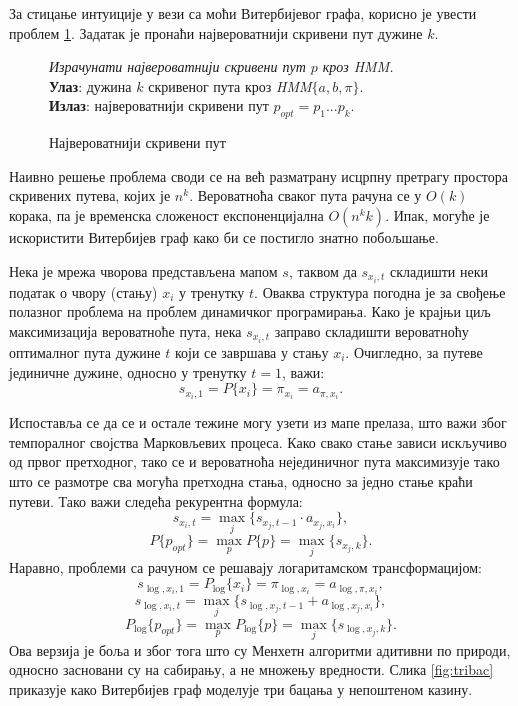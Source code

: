 \documentclass[12pt,oneside]{memoir}
\newenvironment{problem}[1][!ht]
{\renewcommand{\algorithmcfname}{Проблем}
\begin{figure}[!ht]
\centering
  \begin{minipage}{.94\linewidth}
	\begin{algorithm}[#1]%
  }{\end{algorithm}
  \end{minipage}
\end{figure}}
\begin{document}
\begin{CJK}{UTF8}{ipxm}
За стицање интуиције у вези са моћи Витербијевог графа, корисно је увести проблем \ref{prob:maxput}. Задатак је пронаћи највероватнији скривени пут дужине $k$.

\begin{problem}[H]
  \SetAlgoLined
  \textit{Израчунати највероватнији скривени пут $p$ кроз \textit{HMM}.}\\
  \textbf{Улаз}: дужина $k$ скривеног пута кроз \textit{HMM}$\{a, b, \pi\}$.\\
  \textbf{Излаз}: највероватнији скривени пут $p_{opt} = p_1...p_k$.
  \caption{Највероватнији скривени пут}
  \label{prob:maxput}
\end{problem}

Наивно решење проблема своди се на већ разматрану исцрпну претрагу простора скривених путева, којих је $n^k$. Вероватноћа сваког пута рачуна се у $O(k)$ корака, па је временска сложеност експоненцијална $O(n^k k)$. Ипак, могуће је искористити Витербијев граф како би се постигло знатно побољшање.

Нека је мрежа чворова представљена мапом $s$, таквом да $s_{x_i, t}$ складишти неки податак о чвору (стању) $x_i$ у тренутку $t$. Оваква структура погодна је за свођење полазног проблема на проблем динамичког програмирања. Како је крајњи циљ максимизација вероватноће пута, нека $s_{x_i, t}$ заправо складишти вероватноћу оптималног пута дужине $t$ који се завршава у стању $x_i$. Очигледно, за путеве јединичне дужине, односно у тренутку $t=1$, важи: $$s_{x_i, 1} = P\{x_i\} = \pi_{x_i} = a_{\pi, x_i}.$$

Испоставља се да се и остале тежине могу узети из мапе прелаза, што важи због темпоралног својства Марковљевих процеса. Како свако стање зависи искључиво од првог претходног, тако се и вероватноћа нејединичног пута максимизује тако што се размотре сва могућа претходна стања, односно за једно стање краћи путеви. Тако важи следећа рекурентна формула: $$s_{x_i, t} = \max_j \{s_{x_j, t-1} \cdot a_{x_j, x_i}\},$$ $$P\{p_{opt}\} = \max_p P\{p\} = \max_j \{s_{x_j, k}\}.$$ Наравно, проблеми са рачуном се решавају логаритамском трансформацијом: $$s_{\log, x_i, 1} = P_{\log}\{x_i\} = \pi_{\log, x_i} = a_{\log, \pi, x_i},$$ $$s_{\log, x_i, t} = \max_j \{s_{\log, x_j, t-1} + a_{\log, x_j, x_i}\},$$ $$P_{\log}\{p_{opt}\} = \max_p P_{\log}\{p\} = \max_j \{s_{\log, x_j, k}\}.$$ Ова верзија је боља и због тога што су Менхетн алгоритми адитивни по природи, односно засновани су на сабирању, а не множењу вредности. Слика \ref{fig:tribac} приказује како Витербијев граф моделује три бацања у непоштеном казину.


\end{CJK}
\end{document}
